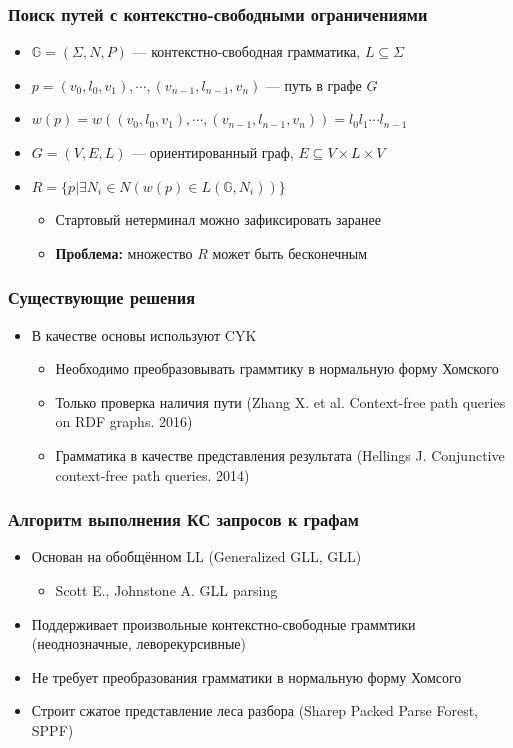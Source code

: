 \documentclass{beamer}
\begin{document}
\begin{frame}[fragile]
  \transwipe[direction=90]
  \frametitle{Поиск путей с контекстно-свободными ограничениями}
  \begin{itemize}
  \item $\mathbb{G} = (\Sigma, N, P)$ --- контекстно-свободная грамматика, $L\subseteq \Sigma$
  \item $p=(v_0,l_0,v_1),\cdots,(v_{n-1},l_{n-1},v_n)$ --- путь в графе $G$
  \item $w(p) = w((v_0,l_0,v_1),\cdots,(v_{n-1},l_{n-1},v_n)) = l_0 l_1 \cdots l_{n-1}$
  \item $G = (V,E,L)$ --- ориентированный граф, $E \subseteq V\times L \times V$
  \item $R =\{ p | \exists N_i \in N (w(p) \in L(\mathbb{G},N_i))\}$
  \begin{itemize}
    \item Стартовый нетерминал можно зафиксировать заранее
    \item \textbf{Проблема:} множество $R$ может быть бесконечным
  \end{itemize}
  \end{itemize}
\end{frame}

\begin{frame}[fragile]
  \transwipe[direction=90]
  \frametitle{Существующие решения}
  \begin{itemize}
  \item В качестве основы используют CYK
    \begin{itemize}
        \item Необходимо преобразовывать граммтику в нормальную форму Хомского
        \item Только проверка наличия пути (Zhang X. et al. Context-free path queries on RDF graphs. 2016)
        \item Грамматика в качестве представления результата (Hellings J. Conjunctive context-free path queries. 2014)
    \end{itemize}
  \end{itemize}

\end{frame}

\begin{frame}[fragile]
  \transwipe[direction=90]
  \frametitle{Алгоритм выполнения КС запросов к графам}

\begin{itemize} 
\item Основан на обобщённом LL (Generalized GLL, GLL)
\begin{itemize} 
  \item Scott E., Johnstone A. GLL parsing
\end{itemize}
\item Поддерживает произвольные контекстно-свободные граммтики (неоднозначные, леворекурсивные)
\item Не требует преобразования грамматики в нормальную форму Хомсого
\item Строит сжатое представление леса разбора (Sharep Packed Parse Forest, SPPF)
\end{itemize}
\end{frame}
\end{document}
